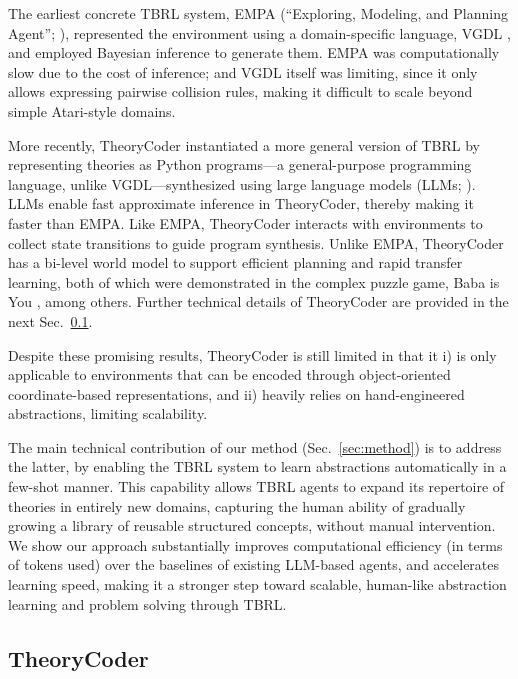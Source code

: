 \documentclass{article}
\theoremstyle{plain}
\theoremstyle{definition}
\theoremstyle{remark}
\begin{document}
The earliest concrete TBRL system, EMPA (``Exploring, Modeling, and Planning Agent''; \citet{tsividis2021human}), represented the environment using a  domain-specific language, VGDL \citep{schaul2013video}, and employed Bayesian inference to generate them. EMPA was computationally slow due to the cost of inference; and VGDL itself was limiting, since it only allows expressing pairwise collision rules, making it difficult to scale beyond simple Atari-style domains.


More recently, TheoryCoder \citep{ahmed2025synthesizing} instantiated a more general version of TBRL by representing theories as Python programs---a general-purpose programming language, unlike VGDL---synthesized using large language models (LLMs; \citet{gpt3}). LLMs enable fast approximate inference in TheoryCoder, thereby making it faster than EMPA. Like EMPA, TheoryCoder interacts with environments to collect state transitions to guide program synthesis. Unlike EMPA, TheoryCoder has a bi-level world model to support efficient planning and rapid transfer learning, both of which were demonstrated in the complex puzzle game, Baba is You \citep{hempuli2019baba,cloos2024baba}, among others.
Further technical details of TheoryCoder are provided in the next Sec.~\ref{sec:tc}.

Despite these promising results, TheoryCoder is still limited in that it i) is only applicable to environments that can be encoded through object-oriented coordinate-based representations, and ii) heavily relies on hand-engineered abstractions, limiting scalability.

The main technical contribution of our method (Sec.~\ref{sec:method}) is to address the latter, by enabling the TBRL system to learn abstractions automatically in a few-shot manner. This capability allows TBRL agents to expand its repertoire of theories in entirely new domains, capturing the human ability of gradually growing a library of reusable structured concepts, without manual intervention. We show our approach substantially improves computational efficiency (in terms of tokens used) over the baselines of existing LLM-based agents, and accelerates learning speed, making it a stronger step toward scalable, human-like abstraction learning and problem solving through TBRL.


\subsection{TheoryCoder}
\label{sec:tc}
\end{document}
